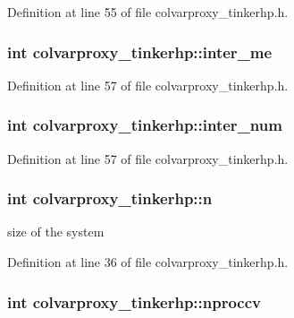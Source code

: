 Definition at line 55 of file colvarproxy\-\_\-tinkerhp.\-h.

\hypertarget{classcolvarproxy__tinkerhp_aeb08de923f57cf20ab17684d8a21146d}{
\subsubsection[{inter\-\_\-me}]{\setlength{\rightskip}{0pt plus 5cm}int colvarproxy\-\_\-tinkerhp\-::inter\-\_\-me\hspace{0.3cm}{\ttfamily [private]}}}\label{classcolvarproxy__tinkerhp_aeb08de923f57cf20ab17684d8a21146d}


Definition at line 57 of file colvarproxy\-\_\-tinkerhp.\-h.

\hypertarget{classcolvarproxy__tinkerhp_a3d7cc5da0cad26eae4e25b3186b380bb}{
\subsubsection[{inter\-\_\-num}]{\setlength{\rightskip}{0pt plus 5cm}int colvarproxy\-\_\-tinkerhp\-::inter\-\_\-num\hspace{0.3cm}{\ttfamily [private]}}}\label{classcolvarproxy__tinkerhp_a3d7cc5da0cad26eae4e25b3186b380bb}


Definition at line 57 of file colvarproxy\-\_\-tinkerhp.\-h.

\hypertarget{classcolvarproxy__tinkerhp_a211e5eea0626d40e351455601f116c21}{
\subsubsection[{n}]{\setlength{\rightskip}{0pt plus 5cm}int colvarproxy\-\_\-tinkerhp\-::n\hspace{0.3cm}{\ttfamily [private]}}}\label{classcolvarproxy__tinkerhp_a211e5eea0626d40e351455601f116c21}


size of the system 



Definition at line 36 of file colvarproxy\-\_\-tinkerhp.\-h.

\hypertarget{classcolvarproxy__tinkerhp_a9d7fa46ab2c701068dcbe1d17521a0c1}{
\subsubsection[{nproccv}]{\setlength{\rightskip}{0pt plus 5cm}int colvarproxy\-\_\-tinkerhp\-::nproccv\hspace{0.3cm}{\ttfamily [private]}}}\label{classcolvarproxy__tinkerhp_a9d7fa46ab2c701068dcbe1d17521a0c1}


